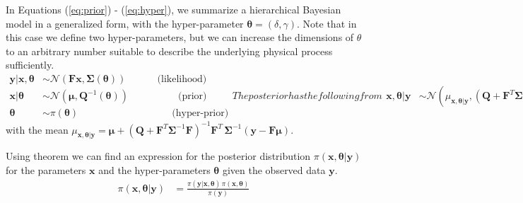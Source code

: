In Equations (\ref{eq:prior}) - (\ref{eq:hyper}), we summarize a hierarchical Bayesian model in a generalized form, with the hyper-parameter $\bm{\theta} = (\delta, \gamma)$.
Note that in this case we define two hyper-parameters, but we can increase the dimensions of $\theta$ to an arbitrary number suitable to describe the underlying physical process sufficiently.
\begin{subequations}
\begin{align}
     \label{eq:likeli}
    \bm{y|x, \theta} &\sim \mathcal{N}(\bm{F x}, \bm{\Sigma}(\bm{\theta}) ) \qquad \quad   \, \text{(likelihood)}\\
    \label{eq:prior}
    \bm{x| \theta} &\sim \mathcal{N}(\bm{\mu}, \bm{Q}^{-1}(\bm{\theta}) ) \qquad \qquad  \quad \! \! \! \text{(prior)} \\
    \label{eq:hyper}
    \bm{\theta} &\sim \pi(\bm{\theta}) \qquad \qquad \qquad \qquad \quad \; \, \text{(hyper-prior)}
 \end{align}
 The posterior has the following from
 \begin{align}
     \label{eq:post}
    \bm{x , \theta|y} &\sim \mathcal{N}( \mu_{\bm{x , \theta|y} } , ( \bm{Q} + \bm{F}^T\bm{\Sigma}^{-1}\bm{F} )^{-1} ) \quad  \text{(posterior)}
\end{align}
\end{subequations}
with the mean $\mu_{\bm{x , \theta|y} } = \bm{\mu} + (\bm{Q} + \bm{F}^T \bm{\Sigma}^{-1} \bm{F})^{-1} \bm{F}^T \, \bm{\Sigma}^{-1} (\bm{y} - \bm{F \mu})$. 


Using  theorem we can find an expression for the posterior distribution $\pi (\bm{x} , \bm{\theta} | \bm{y})$ for the parameters $\bm{x}$ and the hyper-parameters $\bm{\theta}$ given the observed data $\bm{y}$.
\begin{align}
    \pi (\bm{x} , \bm{\theta} | \bm{y}) &= \frac{\pi( \bm{y} | \bm{x}, \bm{\theta} ) \, \pi(\bm{x},  \bm{\theta}) }{\pi(\bm{y})}
\end{align}

